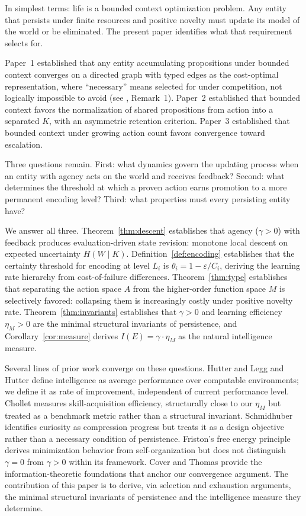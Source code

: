 \documentclass[11pt]{article}
\theoremstyle{definition}
\theoremstyle{remark}
\begin{document}
In simplest terms: life is a bounded context optimization problem. Any entity that persists under finite resources and positive novelty must update its model of the world or be eliminated. The present paper identifies what that requirement selects for.

Paper~1 \cite{McCarthy2026a} established that any entity accumulating
propositions under bounded context converges on a directed
graph with typed edges as the cost-optimal representation, where ``necessary'' means selected for under
competition, not logically impossible to avoid (see \cite{McCarthy2026a},
Remark~1). Paper~2 \cite{McCarthy2026b} established that bounded context favors the
normalization of shared propositions from action into a separated $K$,
with an asymmetric retention criterion. Paper~3 \cite{McCarthy2026c} established that
bounded context under growing action count favors convergence toward
escalation.

Three questions remain. First: what dynamics govern the updating
process when an entity with agency acts on the world and receives
feedback? Second: what determines the threshold at which a proven
action earns promotion to a more permanent encoding level? Third:
what properties must every persisting entity have?

We answer all three. Theorem~\ref{thm:descent} establishes that
agency ($\gamma > 0$) with feedback produces evaluation-driven state
revision: monotone local descent on expected uncertainty
$H(W \mid K)$. Definition~\ref{def:encoding} establishes that the
certainty threshold for encoding at level $L_i$ is
$\theta_i = 1 - \varepsilon / C_i$, deriving the learning rate
hierarchy from cost-of-failure differences.
Theorem~\ref{thm:type} establishes that separating the action space
$A$ from the higher-order function space $M$ is selectively favored:
collapsing them is increasingly costly under positive novelty rate.
Theorem~\ref{thm:invariants} establishes that $\gamma > 0$ and
learning efficiency $\eta_M > 0$ are the minimal structural invariants
of persistence, and Corollary~\ref{cor:measure} derives
$I(E) = \gamma \cdot \eta_M$ as the natural intelligence measure.

Several lines of prior work converge on these questions.
Hutter
\cite{Hutter2005} and Legg and Hutter \cite{LeggHutter2007} define
intelligence as average performance over computable environments;
we define it as rate of improvement, independent of current
performance level. Chollet \cite{Chollet2019} measures
skill-acquisition efficiency, structurally close to our $\eta_M$ but
treated as a benchmark metric rather than a structural invariant.
Schmidhuber \cite{Schmidhuber2010} identifies curiosity as compression
progress but treats it as a design objective rather than a necessary
condition of persistence. Friston's free energy principle
\cite{Friston2010} derives minimization behavior from
self-organization but does not distinguish $\gamma = 0$ from
$\gamma > 0$ within its framework. Cover and Thomas \cite{Cover2006}
provide the information-theoretic foundations that anchor our
convergence argument. The contribution of this paper is to derive,
via selection and exhaustion arguments, the minimal structural
invariants of persistence and the intelligence measure they determine.
\end{document}

